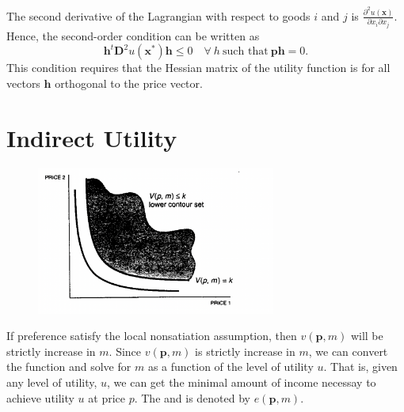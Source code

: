 The second derivative of the Lagrangian with respect to goods $i$ and $j$ is $\frac{\partial^2 u(\mathbf{x})}{\partial x_i \partial x_j}$. Hence, the second-order condition can be written as
\[
\mathbf{h}^t \mathbf{D}^2 u(\mathbf{x}^*) \mathbf{h} \leq 0 \quad \forall \ h \ \text{such that} \ \mathbf{ph} = 0.
\]
This condition requires that the Hessian matrix of the utility function is  for all vectors $\mathbf{h}$ orthogonal to the price vector.


\section{Indirect Utility}


\begin{figure}
    \center
    \includegraphics[width=0.7\textwidth]{img/fig7-2}
    \caption{}
\end{figure}

If preference satisfy the local nonsatiation assumption, then $v(\mathbf{p}, m)$ will be strictly increase in $m$. 
Since $v(\mathbf{p}, m)$ is strictly increase in $m$, we can convert the function and solve for $m$ as a function of the level of utility $u$.
That is, given any level of utility, $u$, we can get the minimal amount of income necessay to achieve utility $u$ at price $p$.
The 
 and is denoted by $e(\mathbf p, m)$.

